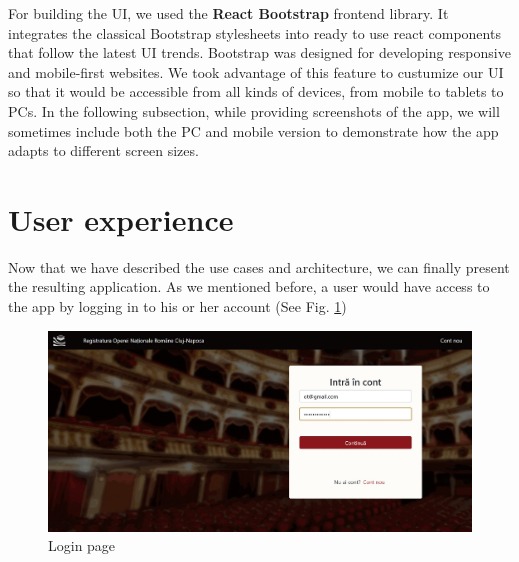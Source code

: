 For building the UI, we used the \textbf{React Bootstrap} frontend library. It integrates the classical Bootstrap stylesheets into ready to use react components that follow the latest UI trends. Bootstrap was designed for developing responsive and mobile-first websites. We took advantage of this feature to custumize our UI so that it would be accessible from all kinds of devices, from mobile to tablets to PCs. In the following subsection, while providing screenshots of the app, we will sometimes include both the PC and mobile version to demonstrate how the app adapts to different screen sizes.



\section{User experience}
\label{section:userExperience}

Now that we have described the use cases and architecture, we can finally present the resulting application. As we mentioned before, a user would have access to the app by logging in to his or her account (See Fig. \ref{login})

\begin{figure}[ht]
    \centering
    \includegraphics[width=5.5in]{images/app/login_filled}
    \caption{Login page}
    \label{login}
\end{figure}

